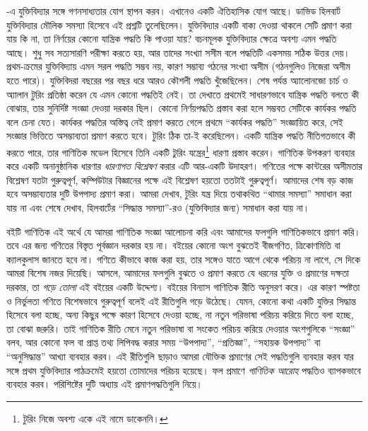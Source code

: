 -এ যুক্তিবিদ্যার সঙ্গে গণনসাধ্যতার যোগ স্থাপন
করব। এখানেও একটি ঐতিহাসিক যোগ আছে। ডাভিড হিলবার্ট যুক্তিবিদ্যার
মৌলিক সমস্যা হিসেবে এই প্রশ্নটি তুলেছিলেন। যুক্তিবিদ্যার একটি
বাক্য দেওয়া থাকলে সেটি প্রমাণ করা যায় কি না, তা নির্ণয়ের কোনো
যান্ত্রিক পদ্ধতি কি পাওয়া যায়? বচনমূলক যুক্তিবিদ্যার ক্ষেত্রে
অবশ্য এমন পদ্ধতি আছে। শুধু সব সত্যসারণি পরীক্ষা করতে হয়, আর
তাদের সংখ্যা সসীম বলে পদ্ধতিটি একসময় সঠিক উত্তর দেয়। প্রথম-ক্রমের
যুক্তিবিদ্যায় এমন সরল পদ্ধতি সম্ভব নয়, কারণ সম্ভাব্য গঠনের সংখ্যা
অসীম (গঠনগুলিও নিজেরা অসীম হতে পারে)। যুক্তিবিদরা বছরের পর বছর
ধরে আরও কৌশলী পদ্ধতি খুঁজেছিলেন। শেষ পর্যন্ত অ্যালোনজো চার্চ ও
অ্যালান টুরিং প্রতিষ্ঠা করেন যে এমন কোনো পদ্ধতিই নেই। তা দেখাতে
প্রথমেই সাধারণভাবে যান্ত্রিক পদ্ধতি বলতে কী বোঝায়, তার সুনির্দিষ্ট
সংজ্ঞা দেওয়া দরকার ছিল। কোনো নির্ণয়পদ্ধতি প্রস্তাব করা হলে সম্ভবত
সেটিকে কার্যকর পদ্ধতি বলে চেনা যেত। কার্যকর পদ্ধতির অস্তিত্ব নেই
প্রমাণ করতে গেলে প্রথমে ``কার্যকর পদ্ধতি'' সংজ্ঞায়িত করে, সেই
সংজ্ঞার ভিত্তিতে অসম্ভাব্যতা প্রমাণ করতে হবে। টুরিং ঠিক তা-ই
করেছিলেন। একটি যান্ত্রিক পদ্ধতি নীতিগতভাবে কী করতে পারে, তার
গাণিতিক মডেল হিসেবে তিনি একটি টুরিং
যন্ত্রের\footnote{টুরিং নিজে অবশ্য একে এই নামে ডাকেননি।} ধারণা প্রস্তাব
করেন। গাণিতিক উপকরণ ব্যবহার করে একটি অনানুষ্ঠানিক ধারণার
\emph{ধারণাগত বিশ্লেষণ} করার এটি আর-একটি উদাহরণ। গণিতের পক্ষে
কান্টরের অসীমতার বিশ্লেষণ যতটা গুরুত্বপূর্ণ, কম্পিউটার বিজ্ঞানের
পক্ষে এই বিশ্লেষণ হয়তো ততটাই গুরুত্বপূর্ণ। আমাদের শেষ বড় কাজ
হবে অসম্ভাব্যতার দুটি উপপাদ্য প্রমাণ করা। আমরা দেখাব, টুরিং
যন্ত্র দিয়ে তথাকথিত ``থামার সমস্যা'' সমাধান করা যায় না এবং শেষে
দেখাব, হিলবার্টের ``সিদ্ধান্ত সমস্যা''-রও (যুক্তিবিদ্যার জন্য)
সমাধান করা যায় না।

বইটি গাণিতিক এই অর্থে যে আমরা গাণিতিক সংজ্ঞা আলোচনা করি এবং
আমাদের ফলগুলি গাণিতিকভাবে প্রমাণ করি। তবে এর জন্য গণিতের
বিস্তৃত পূর্বজ্ঞান দরকার হয় না। বইয়ের কোনো অংশ বুঝতেই
বীজগণিত, ত্রিকোণমিতি বা ক্যালকুলাস জানতে হবে না। গণিতে কীভাবে কাজ
করা হয়, তার সঙ্গেও যাতে আগে থেকে পরিচয় না লাগে, সে দিকে আমরা
বিশেষ নজর দিয়েছি। আসলে, আমাদের ফলগুলি বুঝতে ও প্রমাণ করতে যে
ধরনের যুক্তি ও প্রমাণের দক্ষতা দরকার, তা \emph{গড়ে তোলা} এই
বইয়ের একটি উদ্দেশ্য। বইয়ের বিন্যাস গাণিতিক রীতি অনুসরণ করে।
এর কারণ স্পষ্টতা ও নির্ভুলতা গণিতে বিশেষভাবে গুরুত্বপূর্ণ বলেই
এই রীতিগুলি গড়ে উঠেছে। যেমন, কোনো কথা একটি যুক্তির সিদ্ধান্ত
হিসেবে বলা হচ্ছে, অন্য কিছুর পক্ষে কারণ হিসেবে দেওয়া হচ্ছে, না
নতুন পরিভাষা পরিচয় করিয়ে দিতে বলা হচ্ছে, তা বোঝা জরুরি। তাই
গাণিতিক রীতি মেনে নতুন পরিভাষা বা সংকেত পরিচয় করিয়ে দেওয়ার
অংশগুলিকে ``সংজ্ঞা'' বলব, আর কোনো ফল বা প্রাপ্ত তথ্য লিপিবদ্ধ করার
সময় ``উপপাদ্য'', ``প্রতিজ্ঞা'', ``সহায়ক উপপাদ্য'' বা
``অনুসিদ্ধান্ত'' আখ্যা ব্যবহার করব। এই রীতিগুলি ছাড়াও আমরা
যৌক্তিক প্রমাণের সেই পদ্ধতিগুলি ব্যবহার করব যার সঙ্গে প্রথম
যুক্তিবিদ্যার পাঠক্রমেই হয়তো তোমাদের পরিচয় হয়েছে। ফল প্রমাণে
\emph{গাণিতিক আরোহ} পদ্ধতিও ব্যাপকভাবে ব্যবহার করব। পরিশিষ্টের
দুটি অধ্যায় এই প্রমাণপদ্ধতিগুলি নিয়ে।

